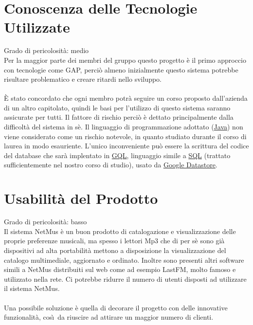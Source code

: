 \section{Conoscenza delle Tecnologie Utilizzate}
Grado di pericolosit\`a: medio\\
Per la maggior parte dei membri del gruppo questo progetto \`e il primo approccio con tecnologie come GAP, 
perci\`o almeno inizialmente questo sistema potrebbe risultare problematico e
creare ritardi nello sviluppo.\\
\\ 
\`E stato concordato che ogni membro potr\`a seguire un corso proposto
  dall'azienda di un altro capitolato, quindi le basi per l'utilizzo di questo
  sistema saranno assicurate per tutti. Il fattore di rischio perci\`o \`e
  dettato principalmente dalla difficolt\`a del sistema in s\`e. Il linguaggio
  di programmazione adottato (\underline{Java}) non viene considerato come un
  rischio notevole, in quanto studiato durante il corso di laurea in modo
  esauriente. L'unico inconveniente pu\`o essere la scrittura del codice del
  database che sar\`a implentato in \underline{GQL}, linguaggio simile a
  \underline{SQL} (trattato sufficientemente nel nostro corso di studio), usato
  da \underline{Google Datastore}.

\section{Usabilit\`a del Prodotto}
Grado di pericolosit\`a: basso\\
Il sistema NetMus \`e un buon prodotto di catalogazione e visualizzazione delle
proprie preferenze musicali, ma spesso i lettori Mp3 che di per s\`e sono gi\`a
dispositivi ad alta portabilit\`a mettono a disposizione la visualizzazione del
catalogo multimediale, aggiornato e ordinato. Inoltre sono presenti altri
software simili a NetMus distribuiti sul web come ad esempio LastFM, molto
famoso e utilizzato nella rete. Ci potrebbe ridurre il numero di utenti disposti
ad utilizzare il sistema NetMus.\\
\\
Una possibile soluzione \`e quella di decorare il progetto con delle
innovative funzionalit\`a, cos\`\i\ da riuscire ad attirare un maggior numero di clienti.

